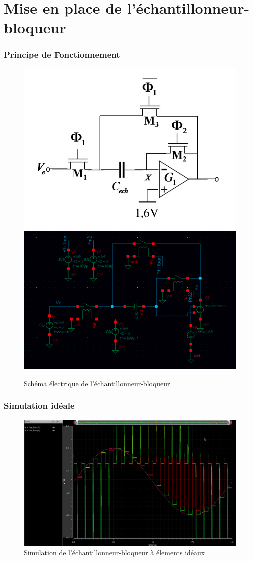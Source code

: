 \documentclass{beamer}
\begin{document}
\section{Mise en place de l'\'echantillonneur-bloqueur}

\begin{frame}
\frametitle{Principe de Fonctionnement}

\begin{figure}[!htb]
\begin{center}
  \includegraphics[width=0.4\linewidth]{Echantillonneur-bloqueur.jpg}
  \includegraphics[width=0.6\linewidth]{Echantillonneur-bloqueur_ideal.png}
  \caption{Sch\'ema \'electrique de l'\'echantillonneur-bloqueur}
\end{center}
\end{figure}

\end{frame}


\begin{frame}
\frametitle{Simulation id\'eale}

\begin{figure}[!htb]
\begin{center}
  \includegraphics[width=0.7\linewidth]{simu_ech_bloqueur_ideal.png}
  \caption{Simulation de l'\'echantillonneur-bloqueur \`a \'elements id\'eaux}
\end{center}
\end{figure}

\end{frame}
\end{document}

